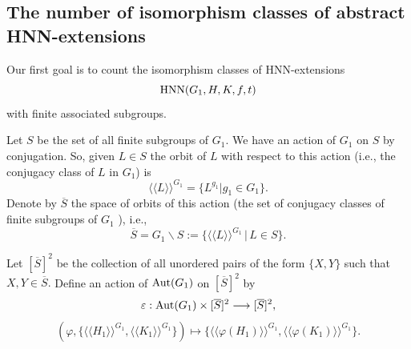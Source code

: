 \documentclass[a4paper,12pt]{article}
\def\aut {{\rm Aut}}
\def\inn {{\rm Inn}}
\def\hnn {{\rm HNN}}
\newtheorem{rem}[thm]{Remark}
\begin{document}
{%

\subsection{The number of isomorphism classes of abstract HNN-extensions %
} \label{cota bonita non conjugados}

 Our first goal is to count the isomorphism classes of HNN-extensions  $$\hnn(G_1, H, K, f, t)$$ with finite associated subgroups. 


Let $ S$ be the set of all finite subgroups of $G_1$. We have an action of $G_1$ on $S$ by conjugation. So, given $L\in S$ the orbit of $L$ with respect to this action (i.e., the conjugacy class of $L$ in $G_1$) is  %
$$\langle\langle L\rangle\rangle^{G_1}= \{L^{g_1}| g_1 \in G_1\}.$$ 
Denote by $\overline{S}$ the space of orbits of this action (the set of conjugacy classes of finite subgroups of $G_1$ ), i.e., $$\overline{S}= G_1\backslash S:=\{ \langle\langle L\rangle\rangle^{G_1} \,|\, L \in S\}.$$    

Let $[\overline{S}]^2$ be the collection of all unordered pairs of the form $\{X, Y\}$ such that $X, Y \in \overline{S}.$  Define an action of $\aut(G_1)$ on $[\overline{S}]^2$ by \begin{equation*} \varepsilon: \aut(G_1) \times [\overline{S}]^2 \longrightarrow [\overline{S}]^2, \end{equation*}
\begin{equation} \label{acao epsilon}
( \varphi, \{ \langle\langle H_1\rangle\rangle^{G_1} , \langle\langle K_1\rangle\rangle^{G_1} \} ) \mapsto \{ \langle\langle \varphi(H_1)\rangle\rangle^{G_1} , \langle\langle  \varphi(K_1)\rangle\rangle^{G_1}  \}.
\end{equation}

}
\end{document}
